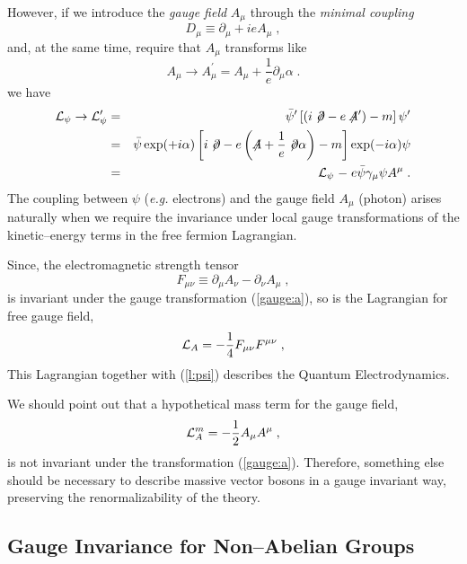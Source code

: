 \documentclass[12pt]{report}
\newcommand{\g}{\gamma}
\newcommand{\sla}[1]{\not \!\! #1}
\newcommand{\lag}{{\cal L}}
\newcommand{\del}{\partial}
\newcommand{\dels}{\not \! \partial}
\begin{document}
However, if we introduce the {\it gauge field} $A_\mu$ through
the {\it minimal coupling}
\[
D_\mu \equiv \del_\mu + i e A_\mu \; ,
\]
and, at the same time, require that $A_\mu$ transforms like
\begin{equation}
A_\mu \to A_\mu^\prime =  A_\mu + \frac{1}{e} \del_\mu \alpha \; .
\label{gauge:a}
\end{equation}
we have
\begin{eqnarray}
\lag_\psi \to \lag_\psi^\prime &=& 
\bar{\psi}^\prime  \left[(i \dels  - e \sla{A}^\prime) - m \right] \psi^\prime 
\nonumber \\
&=& \bar{\psi} \exp(+i \alpha )  
\left[i \dels  - e \left(\sla{A} + \frac{1}{e}\dels\alpha\right) - m\right]
\exp(-i \alpha) \psi 
\nonumber \\
&=& \lag_\psi \; {  - \; e \bar{\psi} \g_\mu \psi A^\mu} \; .
\label{l:psi}
\end{eqnarray}
The coupling between $\psi$ ({\it e.g.} electrons) and the gauge
field $A_\mu$ (photon) arises naturally when we require the
invariance under local gauge transformations of the kinetic--energy
terms in the free fermion Lagrangian. 

Since, the electromagnetic strength tensor 
\begin{equation}
F_{\mu\nu} \equiv \del_\mu A_\nu - \del_\nu A_\mu \; ,
\label{abe:f}
\end{equation}
is invariant under the gauge transformation (\ref{gauge:a}), so is
the Lagrangian for free gauge field,
\begin{equation}
\lag_A = - \frac{1}{4} F_{\mu\nu}  F^{\mu\nu} \; ,
\label{abe:l}
\end{equation}
This Lagrangian together with (\ref{l:psi}) describes the Quantum
Electrodynamics. 

We should point out that a hypothetical mass term for the gauge field, 
\[
\lag_A^m  =  - \frac{1}{2} A_\mu  A^{\mu} \; ,
\]
is not invariant under the transformation (\ref{gauge:a}). 
Therefore, something else should be necessary to describe massive
vector bosons in a gauge invariant way, preserving the
renormalizability of the theory.


\subsection{Gauge Invariance for Non--Abelian Groups} \indent
\end{document}
